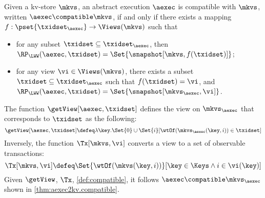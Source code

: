 \begin{definition}
\label{def:compatible}
Given a kv-store \(\mkvs\),
an abstract execution \(\aexec\) is compatible with \(\mkvs\), written 
\(\aexec \compatible \mkvs\), if and only if there exists a  mapping 
\(f: \pset{\txidset_{\aexec}} \rightarrow \Views(\mkvs)\)
such that  
\begin{itemize}
\item for any subset \(\txidset \subseteq \txidset_{\aexec}\), then \(\RP_{\LWW}(\aexec, \txidset) = \Set{\snapshot[\mkvs, f(\txidset)]}\); 
\item for any view \(\vi \in \Views(\mkvs)\), there exists a subset \(\txidset \subseteq \txidset_{\aexec}\) 
such that \(f(\txidset) = \vi\), and \(\RP_{\LWW}(\aexec, \txidset) = \Set{\snapshot[\mkvs_{\aexec}, \vi]}\).
\end{itemize}
\end{definition}

The function \(\getView[\aexec, \txidset]\) defines the view on \( \mkvs_\aexec \) that corresponds to \( \txidset \) as the following:
\[
    \getView[\aexec, \txidset] \defeq \lambda \key. \Set{0} \cup \Set{i}[\wtOf(\mkvs_{\aexec}(\key, i)) \in \txidset]
\]
Inversely, the function \( \Tx[\mkvs, \vi] \) converts a view to a set of observable transactions:
\[
    \Tx[\mkvs, \vi] \defeq \Set{\wtOf(\mkvs(\key, i))}[\key \in \Keys \land i \in \vi(\key)]
\]
Given \( \getView \), \( \Tx \), \cref{def:compatible}, 
it follows \( \aexec \compatible \mkvs_{\aexec} \) shown in \cref{thm:aexec2kv.compatible}.

